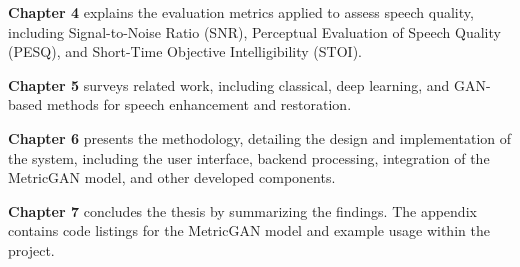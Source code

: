 \textbf{Chapter 4} explains the evaluation metrics applied to assess speech quality, including Signal-to-Noise Ratio (SNR), Perceptual Evaluation of Speech Quality (PESQ), and Short-Time Objective Intelligibility (STOI). 

\textbf{Chapter 5} surveys related work, including classical, deep learning, and GAN-based methods for speech enhancement and restoration. 

\textbf{Chapter 6} presents the methodology, detailing the design and implementation of the system, including the user interface, backend processing, integration of the MetricGAN model, and other developed components. 

\textbf{Chapter 7} concludes the thesis by summarizing the findings. The appendix contains code listings for the MetricGAN model and example usage within the project.

